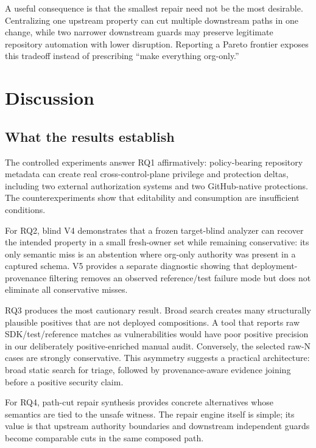 \documentclass[sigconf,review,anonymous]{acmart}
\newcommand{\N}{\textsf{N}}
\begin{document}
A useful consequence is that the smallest repair need not be the most desirable.
Centralizing one upstream property can cut multiple downstream paths in one
change, while two narrower downstream guards may preserve legitimate repository
automation with lower disruption.  Reporting a Pareto frontier exposes this
tradeoff instead of prescribing ``make everything org-only.''

\section{Discussion}

\subsection{What the results establish}

The controlled experiments answer RQ1 affirmatively: policy-bearing repository
metadata can create real cross-control-plane privilege and protection deltas,
including two external authorization systems and two GitHub-native protections.
The counterexperiments show that editability and consumption are insufficient
conditions.

For RQ2, blind V4 demonstrates that a frozen target-blind analyzer can recover
the intended property in a small fresh-owner set while remaining conservative:
its only semantic miss is an abstention where org-only authority was present in
a captured schema.  V5 provides a separate diagnostic showing that
deployment-provenance filtering removes an observed reference/test failure mode
but does not eliminate all conservative misses.

RQ3 produces the most cautionary result.  Broad search creates many structurally
plausible positives that are not deployed compositions.  A tool that reports
raw SDK/test/reference matches as vulnerabilities would have poor positive
precision in our deliberately positive-enriched manual audit.  Conversely, the
selected raw-\N{} cases are strongly conservative.  This asymmetry suggests a
practical architecture: broad static search for triage, followed by
provenance-aware evidence joining before a positive security claim.

For RQ4, path-cut repair synthesis provides concrete alternatives whose semantics
are tied to the unsafe witness.  The repair engine itself is simple; its value is
that upstream authority boundaries and downstream independent guards become
comparable cuts in the same composed path.
\end{document}
